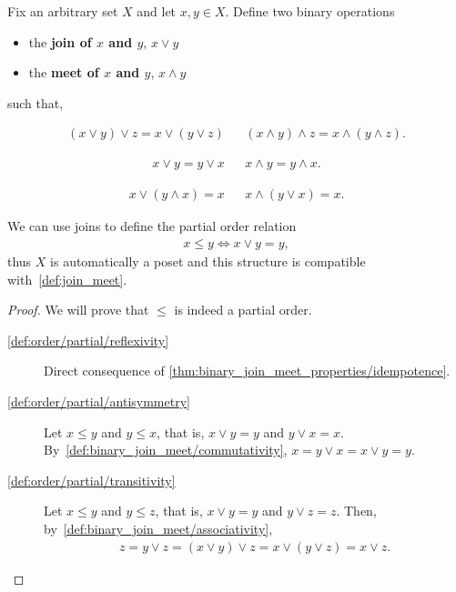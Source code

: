 \begin{definition}\label{def:binary_join_meet}
  Fix an arbitrary set \( X \) and let \( x, y \in X \). Define two binary operations
  \begin{itemize}
    \item the \textbf{join of \( x \) and \( y \)}, \( x \lor y \)
    \item the \textbf{meet of \( x \) and \( y \)}, \( x \land y \)
  \end{itemize}
  such that,
  \begin{description}
    \begin{align*}
      (x \lor y) \lor z = x \lor (y \lor z)
      &&
      (x \land y) \land z = x \land (y \land z).
    \end{align*}

    \begin{align*}
      x \lor y = y \lor x
      &&
      x \land y = y \land x.
    \end{align*}

    \begin{align*}
      x \lor (y \land x) = x
      &&
      x \land (y \lor x) = x.
    \end{align*}
  \end{description}

  We can use joins to define the partial order relation
  \begin{align*}
    x \leq y \iff x \lor y = y,
  \end{align*}
  thus \( X \) is automatically a poset and this structure is compatible with~\cref{def:join_meet}.
\end{definition}
\begin{proof}
  We will prove that \( \leq \) is indeed a partial order.
  \begin{description}
    \item[\ref{def:order/partial/reflexivity}] Direct consequence of \cref{thm:binary_join_meet_properties/idempotence}.
    \item[\ref{def:order/partial/antisymmetry}] Let \( x \leq y \) and \( y \leq x \), that is, \( x \lor y = y \) and \( y \lor x = x \). By~\ref{def:binary_join_meet/commutativity}, \( x = y \lor x = x \lor y = y \).
    \item[\ref{def:order/partial/transitivity}] Let \( x \leq y \) and \( y \leq z \), that is, \( x \lor y = y \) and \( y \lor z = z \). Then, by~\ref{def:binary_join_meet/associativity},
    \begin{align*}
      z = y \lor z = (x \lor y) \lor z = x \lor (y \lor z) = x \lor z.
    \end{align*}
  \end{description}
\end{proof}

